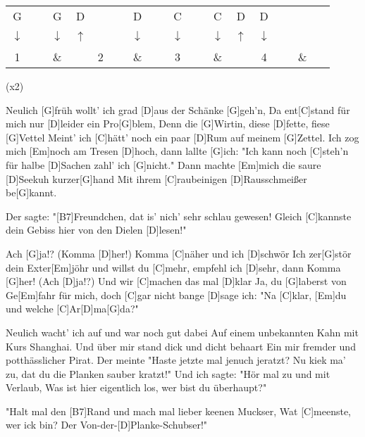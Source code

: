

\begin{guitar}
	\newcommand{\up}{$\uparrow$}%
	\newcommand{\down}{$\downarrow$}%
	{\footnotesize \setlength{\tabcolsep}{3pt} \begin{tabular}{|cccc|cccc|cccc|cccc|}
			G & ~ & G & D & ~ & ~ & D & ~ & C & ~ & C & D & D & ~ & ~ & ~ \\
			\down & ~ & \down & \up & ~ & ~ & \down & ~ & \down & ~ & \down & \up & \down & ~ & ~ & ~ \\
			1 & ~ & \& & ~ & 2 & ~ & \& & ~ & 3 & ~ & \& & ~ & 4 & ~ & \& & ~ 
	\end{tabular}} (x2)
	
	Neulich [G]früh wollt' ich grad [D]aus der Schänke [G]geh'n,
	Da ent[C]stand für mich nur [D]leider ein Pro[G]blem,
	Denn die [G]Wirtin, diese [D]fette, fiese [G]Vettel
	Meint' ich [C]hätt' noch ein paar [D]Rum auf meinem [G]Zettel.
	Ich zog mich [Em]noch am Tresen [D]hoch, dann lallte [G]ich:
	"Ich kann noch [C]steh'n für halbe [D]Sachen zahl' ich [G]nicht."
	Dann machte [Em]mich die saure [D]Seekuh kurzer[G]hand
	Mit ihrem [C]raubeinigen [D]Rausschmeißer be[G]kannt.

	Der sagte: "[B7]Freundchen, dat is' nich' sehr schlau gewesen!
	Gleich [C]kannste dein Gebiss hier von den Dielen [D]lesen!"\vspace{-.1em}
	
	Ach [G]ja!? (Komma [D]her!) Komma [C]näher und ich [D]schwör
	Ich zer[G]stör dein Exter[Em]jöhr und willst du [C]mehr, empfehl ich [D]sehr, dann
	Komma [G]her! (Ach [D]ja!?) Und wir [C]machen das mal [D]klar
	Ja, du [G]laberst von Ge[Em]fahr für mich, doch [C]gar nicht bange [D]sage ich:
	"Na [C]klar, [Em]du und welche [C]Ar[D]ma[G]da?"\vspace{-.1em}
	
	Neulich wacht' ich auf und war noch gut dabei
	Auf einem unbekannten Kahn mit Kurs Shanghai.
	Und über mir stand dick und dicht behaart
	Ein mir fremder und potthässlicher Pirat.
	Der meinte "Haste jetzte mal jenuch jeratzt?
	Nu kiek ma' zu, dat du die Planken sauber kratzt!"
	Und ich sagte: "Hör mal zu und mit Verlaub,
	Was ist hier eigentlich los, wer bist du überhaupt?"
	
	"Halt mal den [B7]Rand und mach mal lieber keenen Muckser,
	Wat [C]meenste, wer ick bin? Der Von-der-[D]Planke-Schubser!"
	

\end{guitar}
